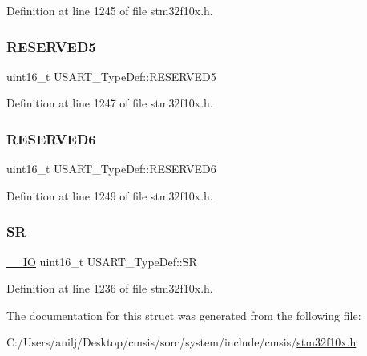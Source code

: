 Definition at line 1245 of file stm32f10x.\+h.

\mbox{\label{struct_u_s_a_r_t___type_def_aa893512291681dfbecc5baa899cfafbf}} 
\subsubsection{\texorpdfstring{R\+E\+S\+E\+R\+V\+E\+D5}{RESERVED5}}
{\footnotesize\ttfamily uint16\+\_\+t U\+S\+A\+R\+T\+\_\+\+Type\+Def\+::\+R\+E\+S\+E\+R\+V\+E\+D5}



Definition at line 1247 of file stm32f10x.\+h.

\mbox{\label{struct_u_s_a_r_t___type_def_acd89bb1cba0381c2be8a551e6d14e9f7}} 
\subsubsection{\texorpdfstring{R\+E\+S\+E\+R\+V\+E\+D6}{RESERVED6}}
{\footnotesize\ttfamily uint16\+\_\+t U\+S\+A\+R\+T\+\_\+\+Type\+Def\+::\+R\+E\+S\+E\+R\+V\+E\+D6}



Definition at line 1249 of file stm32f10x.\+h.

\mbox{\label{struct_u_s_a_r_t___type_def_a3f1fd9f0c004d3087caeba4815faa41c}} 
\subsubsection{\texorpdfstring{SR}{SR}}
{\footnotesize\ttfamily \hyperlink{core__sc300_8h_aec43007d9998a0a0e01faede4133d6be}{\+\_\+\+\_\+\+IO} uint16\+\_\+t U\+S\+A\+R\+T\+\_\+\+Type\+Def\+::\+SR}



Definition at line 1236 of file stm32f10x.\+h.



The documentation for this struct was generated from the following file\+:\begin{DoxyCompactItemize}
\item 
C\+:/\+Users/anilj/\+Desktop/cmsis/sorc/system/include/cmsis/\hyperlink{stm32f10x_8h}{stm32f10x.\+h}\end{DoxyCompactItemize}
